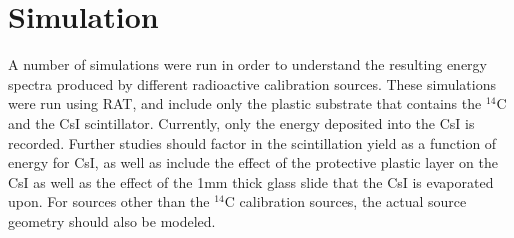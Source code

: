 \documentclass[11pt]{article}
\newcommand{\nuc}[2]{\ensuremath{^{#1}}#2}
\begin{document}
\section{Simulation}
A number of simulations were run in order to understand the resulting energy spectra produced by different radioactive calibration sources.
These simulations were run using RAT, and include only the plastic substrate that contains the \nuc{14}{C} and the CsI scintillator.
Currently, only the energy deposited into the CsI is recorded. Further studies should factor in the scintillation yield as a function of energy for CsI, as well as include the effect of 
the protective plastic layer on the CsI as well as the effect of the 1mm thick glass slide that the CsI is evaporated upon. For sources other than the \nuc{14}{C} calibration sources, the actual source geometry
should also be modeled. 
\end{document}
